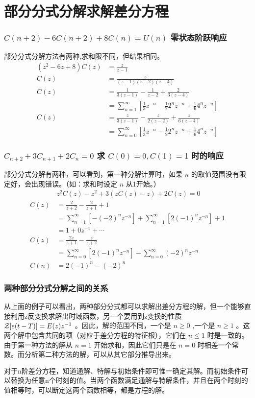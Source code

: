 \documentclass{beamer}
\begin{document}
\section{部分分式分解求解差分方程}
\label{sec-8}
\begin{frame}
\frametitle{$C(n+2)-6C(n+2)+8C(n)=U(n)$ 零状态阶跃响应}
\label{sec-8-1}

部分分式分解方法有两种,求和限不同，但结果相同。
\begin{align*}
(z^2-6z+8)C(z)&=\frac{z}{z-1} \\
C(z) &= \frac{z}{(z-1)(z-2)(z-4)}\\
C(z) &=\frac{1}{3(z-1)}-\frac{1}{z-2}+\frac{2}{3(z-4)} \\
 &=\sum_{n=1}^{\infty}[\frac{1}{3}z^{-n}-\frac{1}{2}2^n z^{-n}+\frac{1}{6}4^n z^{-n}] \\
C(z) &=\frac{z}{3(z-1)}-\frac{z}{2(z-2)}+\frac{z}{6(z-4)}\\
 &=\sum_{n=0}^{\infty}[\frac{1}{3}z^{-n}-\frac{1}{2}2^n z^{-n}+\frac{1}{6}4^n z^{-n}] 
\end{align*}
\end{frame}
\begin{frame}
\frametitle{$C_{n+2}+3C_{n+1}+2C_{n}=0$ 求 $C(0)=0,C(1)=1$ 时的响应}
\label{sec-8-2}

部分分式分解有两种，可以看到，第一种分解计算时，如果 $n$ 的取值范围没有限定好，会出现错误。（如：求和时设定 $n$ 从1开始。）
\begin{align*}
& z^2C(z)-z^2+3(zC(z)-z)+2C(z)=0 \\
C(z) &= \frac{2}{z+2}-\frac{2}{z+1}+1 \\
     &= \sum_{n=1}^{\infty}[-(-2)^{n} z^{-n}]+\sum_{n=1}^{\infty}[2(-1)^n z^{-n}]+1 \\
     &= 1+0z^{-1}+\cdots \\
C(z) &=\frac{2z}{z+1}-\frac{z}{z+2} \\
     &=\sum_{n=0}^{\infty}[2(-1)^n z^{-n}]-\sum_{n=0}^{\infty}(-2)^n z^{-n}\\
C(n) &= 2(-1)^n-(-2)^n
\end{align*}
\end{frame}
\begin{frame}
\frametitle{两种部分分式分解之间的关系}
\label{sec-8-3}

从上面的例子可以看出，两种部分分式都可以求解出差分方程的解，但一个能够直接利用z反变换求解出时域函数，另一个要用到z变换的性质 ${\cal Z}[e(t-T)]=E(z)z^{-1}$ 。因此，解的范围不同，一个是 $n\geq 0$ ,一个是 $n\geq 1$ 。这两个解中包含共同的项（对应于差分方程的特征根），它们在 $n\leq 1$ 时是一致的。由于第一种方法的解从 $n=1$ 开始求和，因此它们只是在 $n=0$ 时相差一个常数。而分析第二种方法的解，可以从其它部分推导出来。

对于n阶差分方程，知道通解、特解与初始条件即可惟一确定其解。而初始条件可以替换为任意n个时刻的值。当两个函数满足通解与特解条件，并且在两个时刻的值相等时，可以断定这两个函数相等，都是方程的解。
\end{frame}
\end{document}

